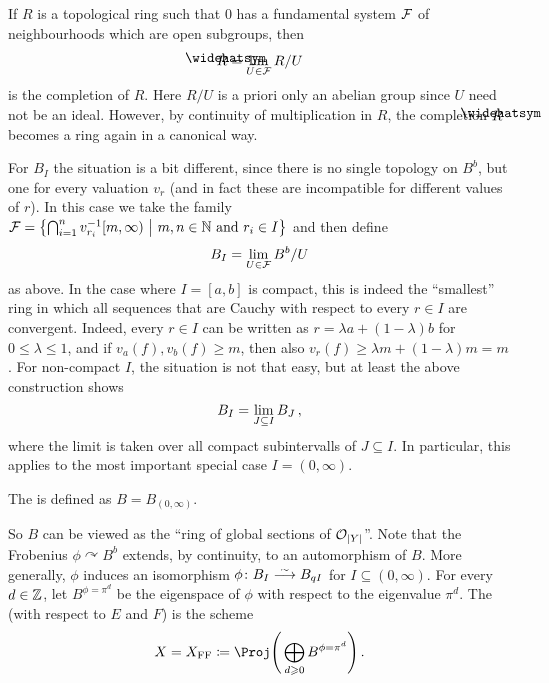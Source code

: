\documentclass[a4paper, 10pt, oneside, DIV=9, chapterprefix=true, numbers=enddot,bibliography=totoc]{scrbook}
\DeclareRobustCommand{\Attention}{\tikz[baseline, anchor=base]\node[draw, regular polygon, regular polygon sides=3, rounded corners=2, thick, inner sep=-0.25pt] at (0,0) {\textbf{!}};}
\begin{document}
\begin{rem}
	If $R$ is a topological ring such that $0$ has a fundamental system $\mathcal{F}$ of neighbourhoods which are open subgroups, then
	\begin{equation*}
		\roof{R}=\limit_{U\in\Ff}R/U
	\end{equation*}
	is the completion of $R$. Here $R/U$ is a priori only an abelian group since $U$ need not be an ideal. However, by continuity of multiplication in $R$, the completion $\roof{R}$ becomes a ring again in a canonical way.
	
	For $B_I$ the situation is a bit different, since there is no single topology on $B^b$, but one for every valuation $v_r$ (and in fact these are incompatible for different values of $r$).  In this case we take the family $\mathcal{F}=\left\{\bigcap_{i=1}^nv_{r_i}^{-1}[m,\infty)\ \middle|\  m,n\in\mathbb{N}\text{ and }r_i\in I\right\}$ and then define
	\begin{equation*}
		B_I=\operatorname*{lim}_{U\in \mathcal{F}}B^b/U
	\end{equation*}
	as above. In the case where $I=[a,b]$ is compact, this is indeed the \enquote{smallest} ring in which all sequences that are Cauchy with respect to every $r\in I$ are convergent. Indeed, every $r\in I$ can be written as $r=\lambda a+(1-\lambda)b$ for $0\leq \lambda\leq 1$, and if $v_a(f),v_b(f)\geq m$, then also $v_r(f)\geq \lambda m+(1-\lambda)m=m$. For non-compact $I$, the situation is not that easy, but at least the above construction shows
	\begin{equation*}
		B_I=\operatorname*{lim}_{J\subseteq I}B_J\,,
	\end{equation*}
	where the limit is taken over all compact subintervalls of $J\subseteq I$. In particular, this applies to the most important special case $I=(0,\infty)$.
\end{rem}
\begin{defi}
	The  is defined as $B=B_{(0,\infty)}$.
\end{defi}
So $B$ can be viewed as the \enquote{ring of global sections of $\mathcal{O}_{|Y|}$}. Note that the Frobenius $\phi\curvearrowright B^b$ extends, by continuity, to an automorphism of $B$. More generally, $\phi$ induces an isomorphism $\phi\colon B_I\isomorphism B_{qI}$ for $I\subseteq (0,\infty)$. For every $d\in\mathbb{Z}$, let $B^{\phi=\pi^d}$ be the eigenspace of $\phi$ with respect to the eigenvalue $\pi^d$.
\numpar{Definition~\smash{\Attention}}
The  (with respect to $E$ and $F$) is the scheme
\begin{equation*}
	X=X_\FFC\coloneqq \Proj\Bigg(\bigoplus_{d\geq 0}B^{\phi=\pi^d}\Bigg)\,.
\end{equation*}
\end{document}
